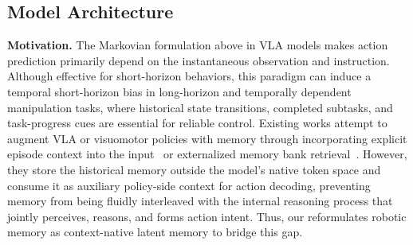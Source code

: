 \subsection{\ourmethod Model Architecture}
\noindent\textbf{Motivation.}
The Markovian formulation above in VLA models makes action prediction primarily depend on the instantaneous observation and instruction.
Although effective for short-horizon behaviors, this paradigm can induce a temporal short-horizon bias in long-horizon and temporally dependent manipulation tasks, where historical state transitions, completed subtasks, and task-progress cues are essential for reliable control.
Existing works attempt to augment VLA or visuomotor policies with memory through incorporating explicit episode context into the input~\cite{lin2026hif,jang2025contextvla,li2025cronusvla} or externalized memory bank retrieval~\cite{shi2025memoryvla,sridhar2025memer}.
However, they store the historical memory outside the model’s native token space and consume it as auxiliary policy-side context for action decoding, preventing memory from being fluidly interleaved with the internal reasoning process that jointly perceives, reasons, and forms action intent.
Thus, our \ourmethod reformulates robotic memory as context-native latent memory to bridge this gap.


